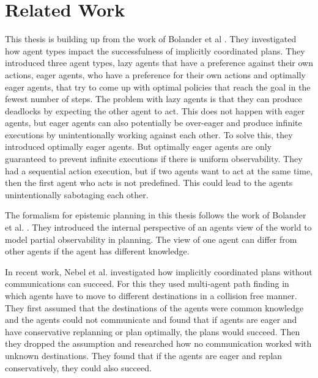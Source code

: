 \chapter{Related Work}\label{chap:relatedwork}

This thesis is building up from the work of Bolander et al \cite{bolander2018better}. They investigated how agent types impact the successfulness of implicitly coordinated plans. They introduced three agent types, lazy agents that have a preference against their own actions, eager agents, who have a preference for their own actions and optimally eager agents, that try to come up with optimal policies that reach the goal in the fewest number of steps. The problem with lazy agents is that they can produce deadlocks by expecting the other agent to act. This does not happen with eager agents, but eager agents can also potentially be over-eager and produce infinite executions by unintentionally working against each other. To solve this, they introduced optimally eager agents. But optimally eager agents are only guaranteed to prevent infinite executions if there is uniform observability.
They had a sequential action execution, but if two agents want to act at the same time, then the first agent who acts is not predefined. This could lead to the agents unintentionally sabotaging each other.

The formalism for epistemic planning in this thesis follows the work of Bolander et al. \cite{bolander2011epistemic}. They introduced the internal perspective of an agents view of the world to model partial observability in planning. The view of one agent can differ from other agents if the agent has different knowledge.

In recent work, Nebel et al. \cite{nebel2019implicitly} investigated how implicitly coordinated plans without communications can succeed. For this they used multi-agent path finding in which agents have to move to different destinations in a collision free manner. They first assumed that the destinations of the agents were common knowledge and the agents could not communicate and found that if agents are eager and have conservative replanning or plan optimally, the plans would succeed. Then they dropped the assumption and researched how no communication worked with unknown destinations. They found that if the agents are eager and replan conservatively, they could also succeed.



